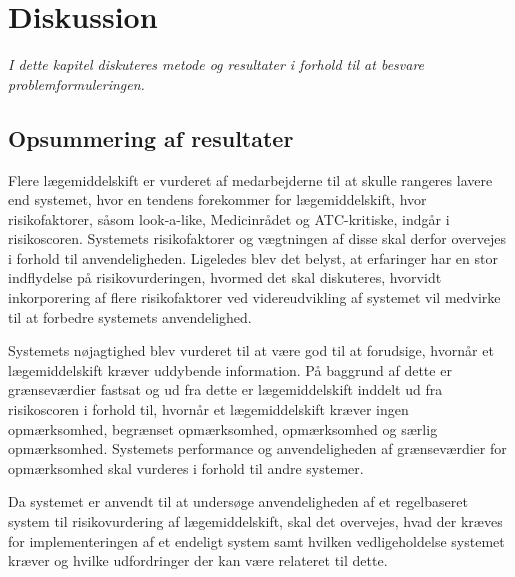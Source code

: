 
\chapter{Diskussion}
\textit{I dette kapitel diskuteres metode og resultater i forhold til at besvare problemformuleringen.}


\section{Opsummering af resultater}
Flere lægemiddelskift er vurderet af medarbejderne til at skulle rangeres lavere end systemet, hvor en tendens forekommer for lægemiddelskift, hvor risikofaktorer, såsom look-a-like, Medicinrådet og ATC-kritiske, indgår i risikoscoren. Systemets risikofaktorer og vægtningen af disse skal derfor overvejes i forhold til anvendeligheden. Ligeledes blev det belyst, at erfaringer har en stor indflydelse på risikovurderingen, hvormed det skal diskuteres, hvorvidt inkorporering af flere risikofaktorer ved videreudvikling af systemet vil medvirke til at forbedre systemets anvendelighed.

Systemets nøjagtighed blev vurderet til at være god til at forudsige, hvornår et lægemiddelskift kræver uddybende information. På baggrund af dette er grænseværdier fastsat og ud fra dette er lægemiddelskift inddelt ud fra risikoscoren i forhold til, hvornår et lægemiddelskift kræver ingen opmærksomhed, begrænset opmærksomhed, opmærksomhed og særlig opmærksomhed. Systemets performance og anvendeligheden af grænseværdier for opmærksomhed skal vurderes i forhold til andre systemer. 

Da systemet er anvendt til at undersøge anvendeligheden af et regelbaseret system til risikovurdering af lægemiddelskift, skal det overvejes, hvad der kræves for implementeringen af et endeligt system samt hvilken vedligeholdelse systemet kræver og hvilke udfordringer der kan være relateret til dette. 

